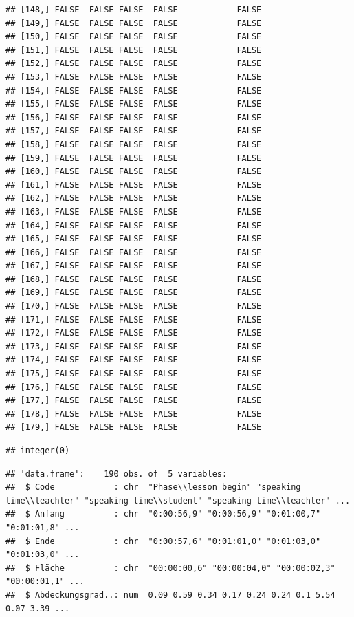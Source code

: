 \documentclass[
  english,
  man,floatsintext]{apa6}
\begin{document}
\begin{verbatim}
## [148,] FALSE  FALSE FALSE  FALSE            FALSE
## [149,] FALSE  FALSE FALSE  FALSE            FALSE
## [150,] FALSE  FALSE FALSE  FALSE            FALSE
## [151,] FALSE  FALSE FALSE  FALSE            FALSE
## [152,] FALSE  FALSE FALSE  FALSE            FALSE
## [153,] FALSE  FALSE FALSE  FALSE            FALSE
## [154,] FALSE  FALSE FALSE  FALSE            FALSE
## [155,] FALSE  FALSE FALSE  FALSE            FALSE
## [156,] FALSE  FALSE FALSE  FALSE            FALSE
## [157,] FALSE  FALSE FALSE  FALSE            FALSE
## [158,] FALSE  FALSE FALSE  FALSE            FALSE
## [159,] FALSE  FALSE FALSE  FALSE            FALSE
## [160,] FALSE  FALSE FALSE  FALSE            FALSE
## [161,] FALSE  FALSE FALSE  FALSE            FALSE
## [162,] FALSE  FALSE FALSE  FALSE            FALSE
## [163,] FALSE  FALSE FALSE  FALSE            FALSE
## [164,] FALSE  FALSE FALSE  FALSE            FALSE
## [165,] FALSE  FALSE FALSE  FALSE            FALSE
## [166,] FALSE  FALSE FALSE  FALSE            FALSE
## [167,] FALSE  FALSE FALSE  FALSE            FALSE
## [168,] FALSE  FALSE FALSE  FALSE            FALSE
## [169,] FALSE  FALSE FALSE  FALSE            FALSE
## [170,] FALSE  FALSE FALSE  FALSE            FALSE
## [171,] FALSE  FALSE FALSE  FALSE            FALSE
## [172,] FALSE  FALSE FALSE  FALSE            FALSE
## [173,] FALSE  FALSE FALSE  FALSE            FALSE
## [174,] FALSE  FALSE FALSE  FALSE            FALSE
## [175,] FALSE  FALSE FALSE  FALSE            FALSE
## [176,] FALSE  FALSE FALSE  FALSE            FALSE
## [177,] FALSE  FALSE FALSE  FALSE            FALSE
## [178,] FALSE  FALSE FALSE  FALSE            FALSE
## [179,] FALSE  FALSE FALSE  FALSE            FALSE
\end{verbatim}

\begin{verbatim}
## integer(0)
\end{verbatim}

\begin{verbatim}
## 'data.frame':    190 obs. of  5 variables:
##  $ Code            : chr  "Phase\\lesson begin" "speaking time\\teachter" "speaking time\\student" "speaking time\\teachter" ...
##  $ Anfang          : chr  "0:00:56,9" "0:00:56,9" "0:01:00,7" "0:01:01,8" ...
##  $ Ende            : chr  "0:00:57,6" "0:01:01,0" "0:01:03,0" "0:01:03,0" ...
##  $ Fläche          : chr  "00:00:00,6" "00:00:04,0" "00:00:02,3" "00:00:01,1" ...
##  $ Abdeckungsgrad..: num  0.09 0.59 0.34 0.17 0.24 0.24 0.1 5.54 0.07 3.39 ...
\end{verbatim}
\end{document}
